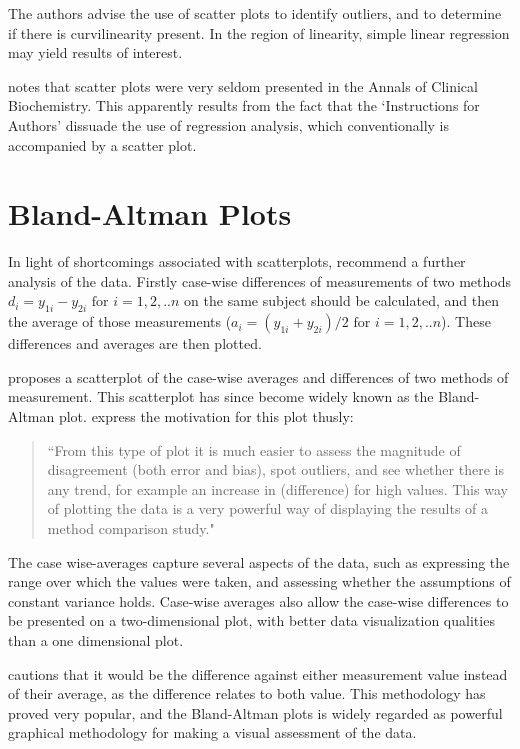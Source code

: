 \documentclass[Main.tex]{subfiles}
\begin{document}
The authors advise the use of scatter plots to identify outliers, and to determine if there is curvilinearity present. In the region of linearity, simple linear regression may yield results of interest.

\citet{Dewitte} notes that scatter plots were very seldom presented in the Annals of Clinical Biochemistry. This apparently results from the fact that the `Instructions for Authors' dissuade the use of regression analysis, which conventionally is accompanied by a scatter plot.



\section{Bland-Altman Plots}




In light of shortcomings associated with scatterplots, \citet*{BA83} recommend a further analysis of the data. Firstly
case-wise differences of measurements of two methods $d_{i} = y_{1i}-y_{2i} \mbox{ for }i=1,2,..n$ on the same subject should be calculated, and then the average of those measurements ($a_{i} = (y_{1i} + y_{2i})/2 \mbox{ for }i=1,2,..n$). These differences and
averages are then plotted. 



\citet{BA83} proposes a scatterplot of the case-wise averages and differences of two methods of measurement. This scatterplot has since become widely known as the Bland-Altman plot. \citet*{BA83} express the
motivation for this plot thusly:
\begin{quote}
	``From this type of plot it is much easier to assess the magnitude
	of disagreement (both error and bias), spot outliers, and see
	whether there is any trend, for example an increase in (difference) for high values. This way of plotting the data is a very powerful way of displaying the results of a method comparison study."
\end{quote}



The case wise-averages capture several aspects of the data, such as expressing the range over which the values were taken, and assessing whether the assumptions of constant variance holds.
Case-wise averages also allow the case-wise differences to be presented on a two-dimensional plot, with better data visualization qualities than a one dimensional plot. 

\citet{BA86} cautions that it would be the difference against either measurement value instead of their average, as the difference relates to both value. This methodology has proved very popular, and the Bland-Altman plots is widely regarded as powerful graphical methodology for making a visual assessment of the data.
\end{document}
